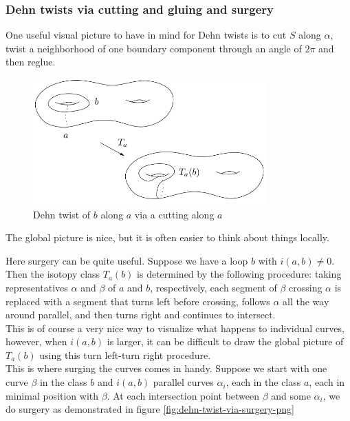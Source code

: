 \documentclass[reqno]{amsart}
\theoremstyle{definition}
\theoremstyle{remark}
\begin{document}
\subsubsection{Dehn twists via cutting and gluing and surgery}
\label{dehn-twist-cut-glue-surgery}

One useful visual picture to have in mind for Dehn twists
is to cut $S$ along $\alpha$, twist a neighborhood of
one boundary component through an angle of $2\pi$ and then
reglue.

\begin{figure}[H]
    \centering
    \includegraphics[width=0.8\textwidth]{dehn-twist-cutting-and-gluing.png}
    \caption{Dehn twist of $b$ along $a$ via a
    cutting along $a$}
    \label{fig:dehn-twist-cutting-and-gluing-png}
\end{figure}

The global picture is nice, but it is often easier to think 
about things locally.

Here surgery can be quite useful. Suppose we have
a loop $b$ with $i \left( a,b \right) \neq 0$. Then
the isotopy class $T_a (b)$ is determined by the following
procedure: taking representatives $\alpha$ and $\beta$ of
$a$ and $b$, respectively, each segment of $\beta$ crossing
$\alpha$ is replaced with a segment that turns left before crossing,
follows $\alpha$ all the way around parallel, and then
turns right and continues to intersect. \\

This is of course a very nice way to visualize what happens to
individual curves, however, when $i \left( a,b \right) $ is
larger, it can be difficult to draw the global picture
of $T_a (b)$ using this turn left-turn right procedure.\\

This is where surging the curves comes in handy. Suppose
we start with one curve $\beta$ in the class $b$ and
$i \left( a,b \right) $ parallel curves $\alpha_i$, each in
the class $a$, each in minimal position with
$\beta$. At each intersection point between $\beta$ and
some $\alpha_i$, we do surgery as demonstrated in figure
\ref{fig:dehn-twist-via-surgery-png}
\end{document}
